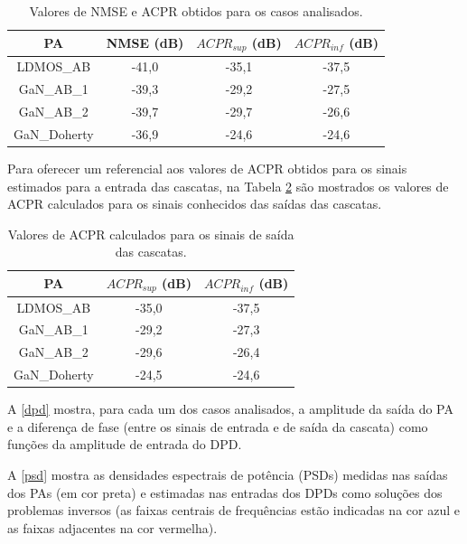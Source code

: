 \begin{table}[H]
\centering
\caption{{Valores de} NMSE e ACPR obtidos para os casos analisados.}
\begin{tabular}{|c|c|c|c|}
\hline
\rule[-1ex]{0pt}{2.5ex}  \textbf{PA} & \textbf{NMSE {(dB)}} & \textbf{$ACPR_{sup}$ {(dB)}} & \textbf{$ACPR_{inf}$ {(dB)}}\\ 
\hline 
\rule[-1ex]{0pt}{2.5ex} LDMOS{\_}AB & -41,0 & -35,1 & -37,5\\ 
\hline 
\rule[-1ex]{0pt}{2.5ex} GaN{\_}AB{\_}1 & -39,3 & -29,2 & -27,5\\ 
\hline 
\rule[-1ex]{0pt}{2.5ex} GaN{\_}AB{\_}2 & -39,7 & -29,7 & -26,6\\ 
\hline 
\rule[-1ex]{0pt}{2.5ex} GaN{\_}Doherty & -36,9 & -24,6 & -24,6\\ 
\hline
\end{tabular}
\label{NMSE_ACPR_DPD} 
\end{table}

{Para oferecer um referencial aos valores de ACPR obtidos para os sinais estimados para a entrada das cascatas, na Tabela \ref{ACPR_SAIDA} são mostrados os valores de ACPR calculados para os sinais conhecidos das saídas das cascatas.}

\begin{table}[H]
\centering
\caption{{Valores de ACPR calculados para os sinais de saída das cascatas.}}
\begin{tabular}{|c|c|c|}
\hline
\rule[-1ex]{0pt}{2.5ex}  \textbf{PA} & \textbf{$ACPR_{sup}$ (dB)} & \textbf{$ACPR_{inf}$ (dB)}\\ 
\hline 
\rule[-1ex]{0pt}{2.5ex} LDMOS{\_}AB & -35,0 & -37,5\\ 
\hline 
\rule[-1ex]{0pt}{2.5ex} GaN{\_}AB{\_}1 & -29,2 & -27,3\\ 
\hline 
\rule[-1ex]{0pt}{2.5ex} GaN{\_}AB{\_}2 & -29,6 & -26,4\\ 
\hline 
\rule[-1ex]{0pt}{2.5ex} GaN{\_}Doherty & -24,5 & -24,6\\ 
\hline
\end{tabular}
\label{ACPR_SAIDA} 
\end{table}

A \autoref{dpd} mostra, para cada um dos casos analisados, a amplitude da saída do PA e a diferença de fase (entre os sinais de entrada e de saída da cascata) como funções da amplitude de entrada do DPD.

A \autoref{psd} mostra as densidades espectrais de potência (PSDs) medidas nas saídas dos PAs (em cor preta) e estimadas nas entradas dos DPDs como soluções dos problemas inversos (as faixas centrais de frequências estão indicadas na cor azul e as faixas adjacentes na cor vermelha).

